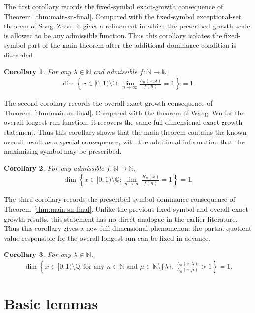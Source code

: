 \documentclass[12pt,reqno]{amsart}
\theoremstyle{definition}
\theoremstyle{plain}
\newtheorem{coro}{Corollary}
\begin{document}
The first corollary records the fixed-symbol exact-growth consequence of Theorem~\ref{thm:main-sn-final}. Compared with the fixed-symbol exceptional-set theorem of Song--Zhou, it gives a refinement in which the prescribed growth scale is allowed to be any admissible function. Thus this corollary isolates the fixed-symbol part of the main theorem after the additional dominance condition is discarded.
\begin{coro}
\label{label:coro1}
For any $\lambda\in\mathbb{N}$ and admissible $f:\mathbb{N}\to\mathbb{N}$, 
\begin{align*}
    \dim{\left\{x\in[0,1)\setminus\mathbb{Q}:
    \lim_{n\to\infty}\frac{L_n(x,\lambda)}{f(n)}=1\right\}}=1.
\end{align*}
\end{coro}

The second corollary records the overall exact-growth consequence of Theorem~\ref{thm:main-sn-final}. Compared with the theorem of Wang--Wu for the overall longest-run function, it recovers the same full-dimensional exact-growth statement. Thus this corollary shows that the main theorem contains the known overall result as a special consequence, with the additional information that the maximising symbol may be prescribed.
\begin{coro}
\label{label:coro2}
For any admissible $f:\mathbb{N}\to\mathbb{N}$, 
\begin{align*}
    \dim{\left\{x\in[0,1)\setminus\mathbb{Q}:
    \lim_{n\to\infty}\frac{R_n(x)}{f(n)}=1\right\}}=1.
\end{align*}
\end{coro}

The third corollary records the prescribed-symbol dominance consequence of Theorem~\ref{thm:main-sn-final}. Unlike the previous fixed-symbol and overall exact-growth results, this statement has no direct analogue in the earlier literature. Thus this corollary gives a new full-dimensional phenomenon: the partial quotient value responsible for the overall longest run can be fixed in advance.
\begin{coro}
\label{label:coro3}
For any $\lambda\in\mathbb{N}$,
\begin{align*}
    \dim{\left\{x\in[0,1)\setminus\mathbb{Q}:
    \text{for any $n\in\mathbb{N}$ and $\mu\in\mathbb{N}\setminus\{\lambda\}$, }\frac{
    L_n(x,\lambda)}{L_n(x,\mu)}>1\right\}}=1.
\end{align*}
\end{coro}

\section{Basic lemmas}
\end{document}
